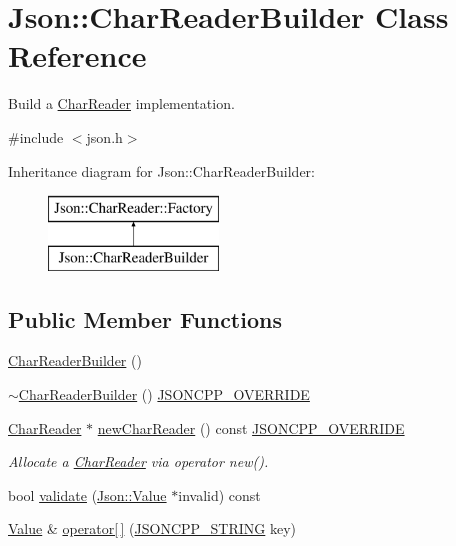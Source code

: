 \hypertarget{classJson_1_1CharReaderBuilder}{}\section{Json\+:\+:Char\+Reader\+Builder Class Reference}
\label{classJson_1_1CharReaderBuilder}


Build a \hyperlink{classJson_1_1CharReader}{Char\+Reader} implementation.  




{\ttfamily \#include $<$json.\+h$>$}

Inheritance diagram for Json\+:\+:Char\+Reader\+Builder\+:\begin{figure}[H]
\begin{center}
\leavevmode
\includegraphics[height=2.000000cm]{classJson_1_1CharReaderBuilder}
\end{center}
\end{figure}
\subsection*{Public Member Functions}
\begin{DoxyCompactItemize}
\item 
\hyperlink{classJson_1_1CharReaderBuilder_a6e197b69a2ede3d87b03b9c5c78ba46a_a6e197b69a2ede3d87b03b9c5c78ba46a}{Char\+Reader\+Builder} ()
\item 
\hyperlink{classJson_1_1CharReaderBuilder_ae8226503f5b947e9d618c39dd992c85c_ae8226503f5b947e9d618c39dd992c85c}{$\sim$\+Char\+Reader\+Builder} () \hyperlink{json_8h_a824d6199c91488107e443226fa6022c5_a824d6199c91488107e443226fa6022c5}{J\+S\+O\+N\+C\+P\+P\+\_\+\+O\+V\+E\+R\+R\+I\+DE}
\item 
\hyperlink{classJson_1_1CharReader}{Char\+Reader} $\ast$ \hyperlink{classJson_1_1CharReaderBuilder_a3a262fcc76c1eb8eebfd4718fb4e9722_a3a262fcc76c1eb8eebfd4718fb4e9722}{new\+Char\+Reader} () const \hyperlink{json_8h_a824d6199c91488107e443226fa6022c5_a824d6199c91488107e443226fa6022c5}{J\+S\+O\+N\+C\+P\+P\+\_\+\+O\+V\+E\+R\+R\+I\+DE}
\begin{DoxyCompactList}\small\item\em Allocate a \hyperlink{classJson_1_1CharReader}{Char\+Reader} via operator new(). \end{DoxyCompactList}\item 
bool \hyperlink{classJson_1_1CharReaderBuilder_af890b5cb70e9b372e41de5c9e6535d21_af890b5cb70e9b372e41de5c9e6535d21}{validate} (\hyperlink{classJson_1_1Value}{Json\+::\+Value} $\ast$invalid) const
\item 
\hyperlink{classJson_1_1Value}{Value} \& \hyperlink{classJson_1_1CharReaderBuilder_a84b35ef443340c06c0aa7b47851d8d86_a84b35ef443340c06c0aa7b47851d8d86}{operator\mbox{[}$\,$\mbox{]}} (\hyperlink{json_8h_a1e723f95759de062585bc4a8fd3fa4be_a1e723f95759de062585bc4a8fd3fa4be}{J\+S\+O\+N\+C\+P\+P\+\_\+\+S\+T\+R\+I\+NG} key)
\end{DoxyCompactItemize}
